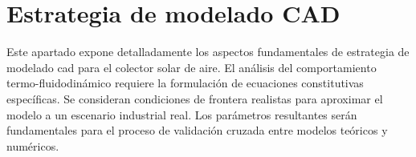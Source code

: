 \section{Estrategia de modelado CAD}
\label{sec:cap04_estrategia_cad}

Este apartado expone detalladamente los aspectos fundamentales de estrategia de modelado cad para el colector solar de aire.
El análisis del comportamiento termo-fluidodinámico requiere la formulación de ecuaciones constitutivas específicas.
Se consideran condiciones de frontera realistas para aproximar el modelo a un escenario industrial real.
Los parámetros resultantes serán fundamentales para el proceso de validación cruzada entre modelos teóricos y numéricos.
